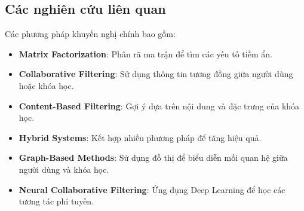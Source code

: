 \subsection{Các nghiên cứu liên quan}

Các phương pháp khuyến nghị chính bao gồm:
\begin{itemize}
    \item \textbf{Matrix Factorization}: Phân rã ma trận để tìm các yếu tố tiềm ẩn.
    \item \textbf{Collaborative Filtering}: Sử dụng thông tin tương đồng giữa người dùng hoặc khóa học.
    \item \textbf{Content-Based Filtering}: Gợi ý dựa trên nội dung và đặc trưng của khóa học.
    \item \textbf{Hybrid Systems}: Kết hợp nhiều phương pháp để tăng hiệu quả.
    \item \textbf{Graph-Based Methods}: Sử dụng đồ thị để biểu diễn mối quan hệ giữa người dùng và khóa học.
    \item \textbf{Neural Collaborative Filtering}: Ứng dụng Deep Learning để học các tương tác phi tuyến.
\end{itemize}
